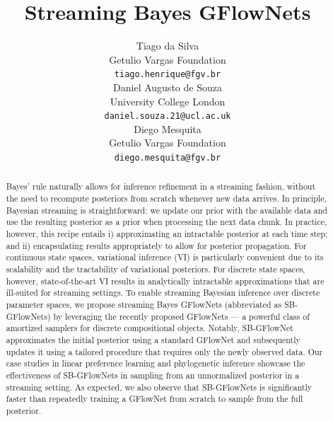 \documentclass{article}
\title{Streaming Bayes GFlowNets}
\author{%
  Tiago da Silva \\
  Getulio Vargas Foundation \\
  \texttt{tiago.henrique@fgv.br} \\
  \And
  Daniel Augusto de Souza \\
  University College London \\
  \texttt{daniel.souza.21@ucl.ac.uk} \\
  \AND
  Diego Mesquita \\
  Getulio Vargas Foundation \\
  \texttt{diego.mesquita@fgv.br} \\
}
\theoremstyle{plain}
\theoremstyle{definition}
\theoremstyle{remark}
\theoremstyle{remark}
\begin{document}
\maketitle
    

\begin{abstract}
Bayes' rule naturally allows for inference refinement in a streaming fashion, without the need to recompute posteriors from scratch whenever new data arrives. In principle, Bayesian streaming is straightforward: we update our prior with the available data and use the resulting posterior as a prior when processing the next data chunk. 
%
In practice, however, this recipe entails i) approximating an intractable posterior at each time step; and ii) encapsulating results appropriately to allow for posterior propagation. 
%
For continuous state spaces, variational inference (VI) is particularly convenient due to its scalability and the tractability of variational posteriors. 
%
For discrete state spaces, however, state-of-the-art VI results in analytically intractable approximations that are ill-suited for streaming settings. 
%
To enable streaming Bayesian inference over discrete parameter spaces, we propose streaming Bayes GFlowNets (abbreviated as SB-GFlowNets) by leveraging the recently proposed GFlowNets --- a powerful class of amortized samplers for discrete compositional objects.
%
Notably, SB-GFlowNet approximates the initial posterior using a standard GFlowNet and subsequently updates it using a tailored procedure that requires only the newly observed data. Our case studies in linear preference learning and phylogenetic inference showcase the effectiveness of SB-GFlowNets in sampling from an unnormalized posterior in a streaming setting. As expected, we also observe that SB-GFlowNets is significantly faster than repeatedly training a GFlowNet from scratch to sample from the full posterior. 
\end{abstract}
\end{document}
